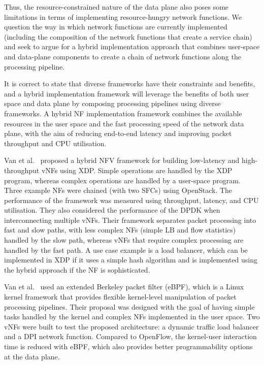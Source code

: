 \documentclass[futureinternet,review,accept,pdftex,moreauthors]{Definitions/mdpi}
\begin{document}
Thus, the resource-constrained nature of the data plane also poses some limitations in terms of implementing resource-hungry network functions. We question the way in which network functions are currently implemented (including the composition of the network functions that create a service chain) and seek to argue for a hybrid implementation approach that combines user-space and data-plane components to create a chain of network functions along the processing pipeline. 

It is correct to state that diverse frameworks have their constraints and benefits, and a hybrid implementation framework will leverage the benefits of both user space and data plane by composing processing pipelines using diverse frameworks. A hybrid NF implementation framework combines the available resources in the user space and the fast processing speed of the network data plane, with the aim of reducing end-to-end latency and improving packet throughput and CPU utilisation.

Van {et al.}~\cite{van2019building} proposed a hybrid NFV framework for building low-latency and high-throughput vNFs using XDP. Simple operations are handled by the XDP program, whereas complex operations are handled by a user-space program. Three example NFs were chained (with two SFCs) using OpenStack. The performance of the framework was measured using throughput, latency, and CPU utilisation. They also considered the performance of the DPDK when interconnecting multiple vNFs. Their framework separates packet processing into fast and slow paths, with less complex NFs (simple LB and flow statistics) handled by the slow path, whereas vNFs that require complex processing are handled by the fast path.  A use case example is a load balancer, which can be implemented in XDP if it uses a simple hash algorithm and is implemented using the hybrid approach if the NF is sophisticated. 

Van et al.~\cite{van2017architecture}  used an extended Berkeley packet filter (eBPF), which is a Linux kernel framework that provides flexible kernel-level manipulation of packet processing pipelines. Their proposal was designed with the goal of having simple tasks handled by the kernel and complex NFs implemented in the user space. Two vNFs were built to test the proposed architecture: a dynamic traffic load balancer and a DPI network function. Compared to OpenFlow, the kernel-user interaction time is reduced with eBPF, which also provides better programmability options at the data plane.  
\end{document}
